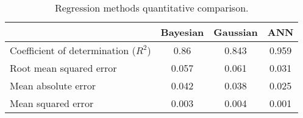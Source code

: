 \begin{table}[htbp]
  \centering

    \begin{tabular}{lccc}
    \hline
          & Bayesian & Gaussian & ANN \\
          \hline
    Coefficient of determination ($R^2$) & 0.86  & 0.843 & 0.959 \\
    Root mean squared error & 0.057 & 0.061 & 0.031 \\
    Mean absolute error & 0.042 & 0.038 & 0.025 \\
    Mean squared error & 0.003 & 0.004 & 0.001 \\
    \hline
    \end{tabular}%
      \caption{Regression methods quantitative comparison.}
  \label{tab:15regressionvalues}%
\end{table}%